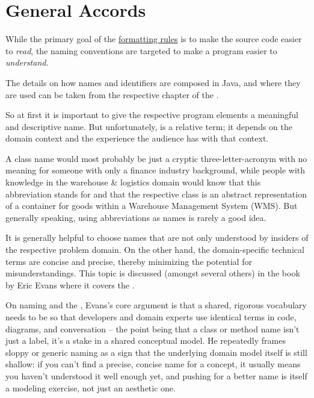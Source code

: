 \chapter{General Accords}\label{sec:GeneralAccords}
While the primary goal of the \hyperref[sec:FormattingTheSourceCode]{formatting rules} is to make the source code easier to \textit{read}, the naming conventions are targeted to make a program easier to \textit{understand}.

The details on how names and identifiers are composed in Java, and where they are used can be taken from the respective chapter of the \jls \autocite{ORACLE_DOC_LANGUAGE_SPECIFICATION:NamesAndIdentifiers}.

So at first it is important to give the respective program elements a meaningful and descriptive name. But unfortunately,  is a relative term; it depends on the domain context and the experience the audience has with that context.

A class name  would most probably be just a cryptic three-letter-acronym with no meaning for someone with only a finance industry background, while people with knowledge in the warehouse \& logistics domain would know that this abbreviation stands for  and that the respective class is an abstract representation of a container for goods within a Warehouse Management System (WMS). But generally speaking, using abbreviations as names is rarely a good idea.

It is generally helpful to choose names that are not only understood by insiders of the respective problem domain. On the other hand, the domain-specific technical terms are concise and precise, thereby minimizing the potential for misunderstandings. This topic is discussed (amongst several others) in the book  by Eric Evans \autocite{Evans:DomainDrivenDesign} where it covers the . 

On naming and the , Evans's core argument is that a shared, rigorous vocabulary needs to be  so that developers and domain experts use identical terms in code, diagrams, and conversation – the point being that a class or method name isn't just a label, it's a stake in a shared conceptual model. He repeatedly frames sloppy or generic naming as a sign that the underlying domain model itself is still shallow: if you can't find a precise, concise name for a concept, it usually means you haven't understood it well enough yet, and pushing for a better name is itself a modeling exercise, not just an aesthetic one.

